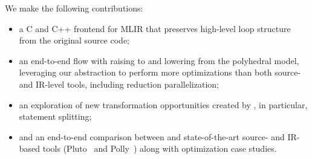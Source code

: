 We make the following contributions:
\begin{itemize}
    \item a C and C++ frontend for MLIR that preserves high-level loop structure from the original source code;
    \item an end-to-end flow with raising to and lowering from the polyhedral model, leveraging our abstraction to perform more optimizations than both source- and IR-level tools, including reduction parallelization;
    \item an exploration of new transformation opportunities created by \tool, in particular, statement splitting;
    \item and an end-to-end comparison between \tool and state-of-the-art source- and IR-based tools (Pluto~\cite{Bondhugula2008Pluto} and Polly~\cite{grosser2015polyhedral}) along with optimization case studies.
\end{itemize}
